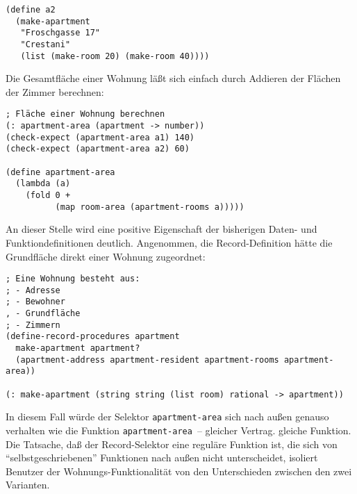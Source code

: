 %
%
\begin{verbatim}
(define a2
  (make-apartment
   "Froschgasse 17"
   "Crestani"
   (list (make-room 20) (make-room 40))))
\end{verbatim}
%
Die Gesamtfläche einer Wohnung läßt sich einfach durch Addieren der
Flächen der Zimmer berechnen:
%
\begin{verbatim}
; Fläche einer Wohnung berechnen
(: apartment-area (apartment -> number))            
(check-expect (apartment-area a1) 140)
(check-expect (apartment-area a2) 60)

(define apartment-area
  (lambda (a)
    (fold 0 +
          (map room-area (apartment-rooms a)))))
\end{verbatim}
%
An dieser Stelle wird eine positive Eigenschaft der bisherigen Daten-
und Funktiondefinitionen deutlich.  Angenommen, die Record-Definition
hätte die Grundfläche direkt einer Wohnung zugeordnet:
%
\begin{verbatim}
; Eine Wohnung besteht aus:
; - Adresse
; - Bewohner
, - Grundfläche
; - Zimmern
(define-record-procedures apartment
  make-apartment apartment?
  (apartment-address apartment-resident apartment-rooms apartment-area))

(: make-apartment (string string (list room) rational -> apartment))
\end{verbatim}
%
In diesem Fall würde der Selektor \texttt{apartment-area} sich nach
außen genauso verhalten wie die Funktion \texttt{apartment-area}~--
gleicher Vertrag. gleiche Funktion.  Die Tatsache, daß der
Record-Selektor eine reguläre Funktion ist, die sich von
"`selbstgeschriebenen"' Funktionen nach außen nicht unterscheidet,
isoliert Benutzer der Wohnungs-Funktionalität von den Unterschieden
zwischen den zwei Varianten.

